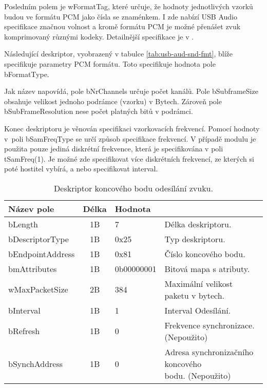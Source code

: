 Posledním polem je wFormatTag, které určuje, že hodnoty jednotlivých vzorků budou ve formátu PCM jako  čísla se znaménkem. I zde nabízí USB Audio specifikace značnou volnost a kromě formátu PCM je možné přenášet zvuk komprimovaný různými kodeky. Detailnější specifikace je v \cite{usb-audio-formats}. 

Následující deskriptor, vyobrazený v tabulce \ref{tab:usb-aud-snd-fmt}, blíže specifikuje parametry PCM formátu. Toto specifikuje hodnota pole bFormatType.

Jak název napovídá, pole bNrChannels určuje počet kanálů. Pole bSubframeSize obsahuje velikost jednoho podrámce (vzorku) v Bytech. Zároveň pole bSubFrameResolution nese počet platných bitů v podrámci.

Konec deskriptoru je věnován specifikaci vzorkovacích frekvencí. Pomocí hodnoty v~poli bSamFreqType se určí způsob specifikace frekvencí. V případě modulu je použita pouze jediná diskrétní frekvence, která je specifikována v poli tSamFreq(1). Je možné zde specifikovat více diskrétních frekvencí, ze kterých si poté hostitel vybírá, a nebo specifikovat interval.


\begin{table}[ht!]
\begin{center}
\begin{tabular}{|l|c|l|l|}
\hline 
Název pole & Délka & Hodnota &  \\ 
\hline
bLength & 1B & 7 & Délka deskriptoru.\\
\hline
bDescriptorType & 1B & 0x25 & Typ deskriptoru. \\
\hline
bEndpointAddress & 1B & 0x81 & Číslo koncového bodu. \\
\hline
bmAttributes & 1B & 0b00000001 & Bitová mapa s atributy.\\ %
\hline
wMaxPacketSize & 2B & 384 & Maximální velikost paketu v bytech.\\ %
\hline
bInterval & 1B & 1 & Interval Odesílání. \\ %
\hline
bRefresh & 1B & 0 & Frekvence synchronizace. (Nepoužito) \\
\hline 
bSynchAddress & 1B & 0 & \makecell[l]{Adresa synchronizačního koncového\\ bodu. (Nepoužito)} \\ %
\hline
\end{tabular} 
\end{center}
\caption{Deskriptor koncového bodu odesílání zvuku.}
\label{tab:usb-aud-snd-ep} 
\end{table}

